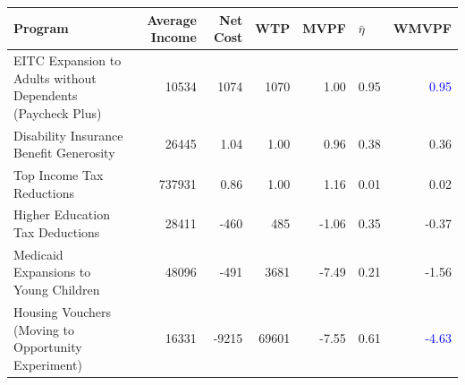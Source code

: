 \begin{tabular}{|p{10.605em}|r|r|r|r|r|r|}
\hline
\rowcolor[rgb]{ 0,  0,  0} \textcolor[rgb]{ 1,  1,  1}{\textbf{Program}} & \multicolumn{1}{p{5.08em}|}{\textcolor[rgb]{ 1,  1,  1}{\textbf{Average Income}}} & \multicolumn{1}{p{2.87em}|}{\textcolor[rgb]{ 1,  1,  1}{\textbf{Net Cost}}} & \multicolumn{1}{l|}{\textcolor[rgb]{ 1,  1,  1}{\textbf{WTP}}} & \multicolumn{1}{l|}{\textcolor[rgb]{ 1,  1,  1}{\textbf{MVPF}}} & \multicolumn{1}{l|}{\textcolor[rgb]{ 1,  1,  1}{\boldmath{}\textbf{$\bar{\eta}$}\unboldmath{}}} & \multicolumn{1}{l|}{\textcolor[rgb]{ 1,  1,  1}{\textbf{WMVPF}}} \bigstrut\\
\hline
\rowcolor[rgb]{ .851,  .851,  .851} EITC Expansion to Adults without Dependents (Paycheck Plus) & 10534 & 1074  & 1070  & 1.00  & 0.95  & \textcolor{blue}{0.95} \bigstrut\\
\hline
Disability Insurance Benefit Generosity & 26445 & 1.04  & 1.00  & 0.96  & 0.38  & 0.36 \bigstrut\\
\hline
\rowcolor[rgb]{ .851,  .851,  .851} Top Income Tax Reductions & 737931 & 0.86  & 1.00  & 1.16  & 0.01  & 0.02 \bigstrut\\
\hline
Higher Education Tax Deductions & 28411 & -460  & 485   & -1.06 & 0.35  & -0.37 \bigstrut\\
\hline
\rowcolor[rgb]{ .851,  .851,  .851} Medicaid Expansions to Young Children & 48096 & -491  & 3681  & -7.49 & 0.21  & -1.56 \bigstrut\\
\hline
Housing Vouchers (Moving to Opportunity Experiment) & 16331 & -9215 & 69601 & -7.55 & 0.61  & \textcolor{blue}{-4.63} \bigstrut\\
\hline
\end{tabular}%
